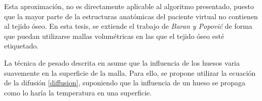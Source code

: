 Esta aproximación, no es directamente aplicable al algoritmo presentado, puesto que la mayor parte de la estructuras anatómicas del paciente virtual no contienen al tejido óseo. En esta tesis, se extiende el trabajo de \emph{Baran y Popovi\'{c}} de forma que puedan utilizarse mallas volumétricas en las que el tejido óseo esté etiquetado.  

%


La técnica de pesado descrita en \cite{Baran:2007} asume que la influencia de los huesos varia suavemente en la superficie de la malla. Para ello, se propone utilizar la ecuación de la difusión \ref{diffusion}, suponiendo que la influencia de un hueso se propaga como lo haría la temperatura en una superficie. 

